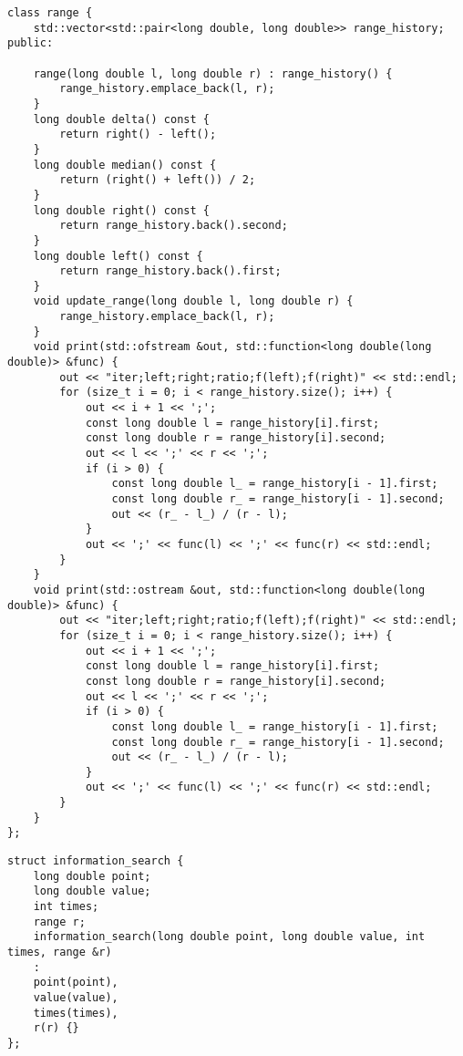 \begin{lstlisting}
class range {
    std::vector<std::pair<long double, long double>> range_history;
public:

    range(long double l, long double r) : range_history() {
        range_history.emplace_back(l, r);
    }
    long double delta() const {
        return right() - left();
    }
    long double median() const {
        return (right() + left()) / 2;
    }
    long double right() const {
        return range_history.back().second;
    }
    long double left() const {
        return range_history.back().first;
    }
    void update_range(long double l, long double r) {
        range_history.emplace_back(l, r);
    }
    void print(std::ofstream &out, std::function<long double(long double)> &func) {
        out << "iter;left;right;ratio;f(left);f(right)" << std::endl;
        for (size_t i = 0; i < range_history.size(); i++) {
            out << i + 1 << ';';
            const long double l = range_history[i].first;
            const long double r = range_history[i].second;
            out << l << ';' << r << ';';
            if (i > 0) {
                const long double l_ = range_history[i - 1].first;
                const long double r_ = range_history[i - 1].second;
                out << (r_ - l_) / (r - l);
            }
            out << ';' << func(l) << ';' << func(r) << std::endl;
        }
    }
    void print(std::ostream &out, std::function<long double(long double)> &func) {
        out << "iter;left;right;ratio;f(left);f(right)" << std::endl;
        for (size_t i = 0; i < range_history.size(); i++) {
            out << i + 1 << ';';
            const long double l = range_history[i].first;
            const long double r = range_history[i].second;
            out << l << ';' << r << ';';
            if (i > 0) {
                const long double l_ = range_history[i - 1].first;
                const long double r_ = range_history[i - 1].second;
                out << (r_ - l_) / (r - l);
            }
            out << ';' << func(l) << ';' << func(r) << std::endl;
        }
    }
};
\end{lstlisting}

\begin{lstlisting}
struct information_search {
    long double point;
    long double value;
    int times;
    range r;
    information_search(long double point, long double value, int times, range &r)
    :
    point(point),
    value(value),
    times(times),
    r(r) {}
};
\end{lstlisting}

